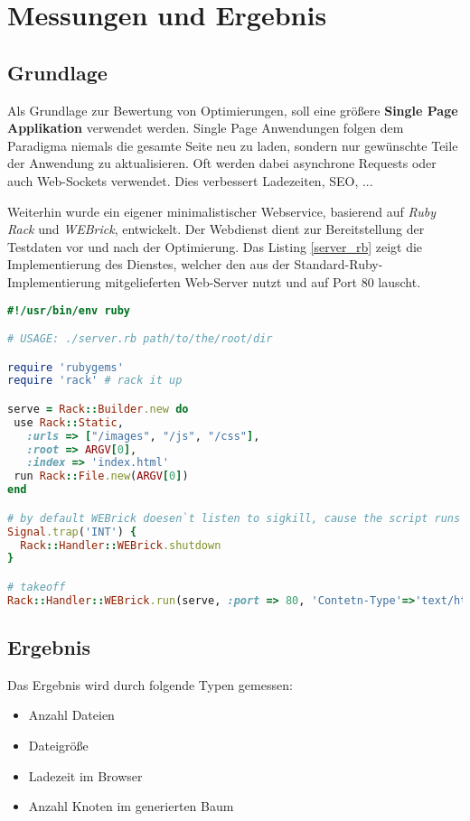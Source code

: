 \section{Messungen und Ergebnis}
\subsection{Grundlage}
Als Grundlage zur Bewertung von Optimierungen, soll eine größere \textbf{Single Page Applikation} verwendet werden. Single Page Anwendungen folgen dem Paradigma niemals die gesamte Seite neu zu laden, sondern nur gewünschte Teile der Anwendung zu aktualisieren. Oft werden dabei asynchrone Requests oder auch Web-Sockets verwendet. Dies verbessert Ladezeiten, SEO, ... 

Weiterhin wurde ein eigener minimalistischer Webservice, basierend auf \textit{Ruby Rack} und \textit{WEBrick}, entwickelt. Der Webdienst dient zur Bereitstellung der Testdaten vor und nach der Optimierung. Das Listing \ref{server_rb} zeigt die Implementierung des Dienstes, welcher den aus der Standard-Ruby-Implementierung mitgelieferten Web-Server nutzt und auf Port 80 lauscht. 

\begin{lstlisting}[label=server_rb,language=Ruby, caption=Ruby Webservice für Messdaten]
#!/usr/bin/env ruby

# USAGE: ./server.rb path/to/the/root/dir

require 'rubygems'
require 'rack' # rack it up

serve = Rack::Builder.new do
 use Rack::Static, 
   :urls => ["/images", "/js", "/css"],
   :root => ARGV[0],
   :index => 'index.html'
 run Rack::File.new(ARGV[0])
end

# by default WEBrick doesen`t listen to sigkill, cause the script runs in a new session. 
Signal.trap('INT') {
  Rack::Handler::WEBrick.shutdown
}

# takeoff
Rack::Handler::WEBrick.run(serve, :port => 80, 'Contetn-Type'=>'text/html')
\end{lstlisting}

\subsection{Ergebnis}
Das Ergebnis wird durch folgende Typen gemessen:
\begin{itemize}
    \item{Anzahl Dateien}
    \item{Dateigröße}
    \item{Ladezeit im Browser}
    \item{Anzahl Knoten im generierten Baum}
\end{itemize}

